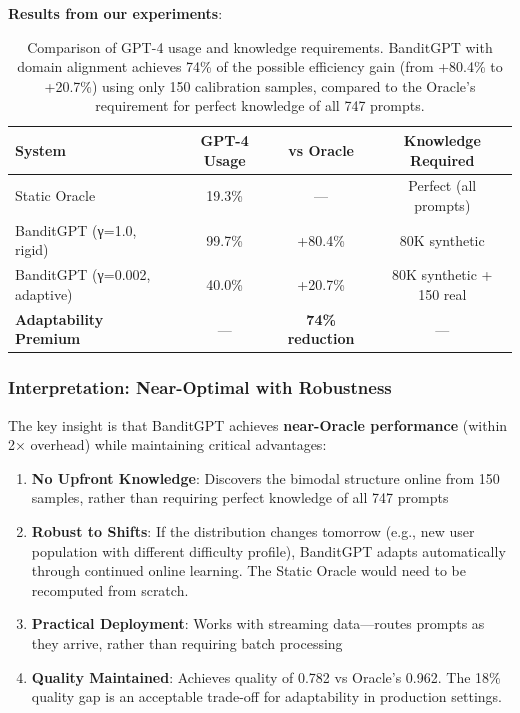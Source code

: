 \textbf{Results from our experiments}:

\begin{table}[h]
\centering
\small
\begin{tabular}{@{}lccc@{}}
\toprule
\textbf{System} & \textbf{GPT-4 Usage} & \textbf{vs Oracle} & \textbf{Knowledge Required} \\ \midrule
Static Oracle & 19.3\% & — & Perfect (all prompts) \\
\midrule
BanditGPT (γ=1.0, rigid) & 99.7\% & +80.4\% & 80K synthetic \\
BanditGPT (γ=0.002, adaptive) & 40.0\% & +20.7\% & 80K synthetic + 150 real \\
\midrule
\textbf{Adaptability Premium} & — & \textbf{74\% reduction} & — \\
\bottomrule
\end{tabular}
\caption{Comparison of GPT-4 usage and knowledge requirements. BanditGPT with domain alignment achieves 74\% of the possible efficiency gain (from +80.4\% to +20.7\%) using only 150 calibration samples, compared to the Oracle's requirement for perfect knowledge of all 747 prompts.}
\label{tab:adaptability_premium}
\end{table}

\subsubsection{Interpretation: Near-Optimal with Robustness}

The key insight is that BanditGPT achieves \textbf{near-Oracle performance} (within 2× overhead) while maintaining critical advantages:

\begin{enumerate}
    \item \textbf{No Upfront Knowledge}: Discovers the bimodal structure online from 150 samples, rather than requiring perfect knowledge of all 747 prompts
    
    \item \textbf{Robust to Shifts}: If the distribution changes tomorrow (e.g., new user population with different difficulty profile), BanditGPT adapts automatically through continued online learning. The Static Oracle would need to be recomputed from scratch.
    
    \item \textbf{Practical Deployment}: Works with streaming data—routes prompts as they arrive, rather than requiring batch processing
    
    \item \textbf{Quality Maintained}: Achieves quality of 0.782 vs Oracle's 0.962. The 18\% quality gap is an acceptable trade-off for adaptability in production settings.
\end{enumerate}

